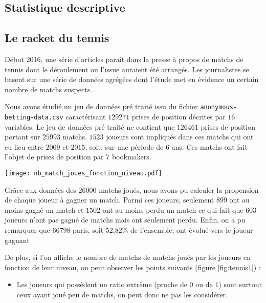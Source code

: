 \documentclass{article}
\begin{document}

\begin{multicols}{2} %

\section{Statistique descriptive}

\subsection{Le racket du tennis}

Début 2016, une série d’articles paraît dans la presse à propos de matchs de tennis dont le déroulement ou l’issue auraient été arrangés. Les journalistes se basent sur une série de données agrégées dont l’étude met en évidence un certain nombre de matchs suspects. 

Nous avons étudié un jeu de données pré traité issu du fichier \texttt{anonymous-betting-data.csv}  caractérisant $129271$ prises de position décrites par $16$ variables. Le jeu de données pré traité ne contient que $126461$ prises de position portant sur $25993$ matchs. $1523$ joueurs sont impliqués dans ces matchs qui ont eu lieu entre $2009$ et $2015$, soit, sur une période de $6$ ans. Ces matchs ont fait l'objet de prises de position par $7$ bookmakers.

\begingroup
    \centering
   \texttt{[image: nb\_match\_joues\_fonction\_niveau.pdf]}
    \label{fig:tennis1}
\endgroup

Grâce aux données des $26000$ matchs joués, nous avons pu calculer la propension de chaque joueur à gagner un match.
Parmi ces joueurs, seulement $899$ ont au moins gagné un match et $1502$ ont au moins perdu un match ce qui fait que $603$ joueurs n'ont pas gagné de matchs mais ont seulement perdu. Enfin, on a pu remarquer que $66798$ paris, soit 52,82\% de l'ensemble, ont évolué vers le joueur gagnant

De plus, si l’on affiche le nombre de matchs de matchs joués par les joueurs en fonction de leur niveau, on peut observer les points suivants (figure \ref{fig:tennis1}) :

\begin{itemize}

  \item Les joueurs qui possèdent un ratio extrême (proche de $0$ ou de $1$) sont surtout ceux ayant joué peu de matchs, on peut donc ne pas les considérer.
  

\end{itemize}
\end{multicols}
\end{document}
